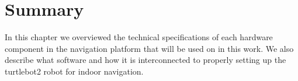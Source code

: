 \section{Summary}
In this chapter we overviewed the technical specifications of each hardware component in the navigation platform that will be used on in this work. We also describe what software and how it is interconnected  to properly setting up the turtlebot2 robot for indoor navigation.


